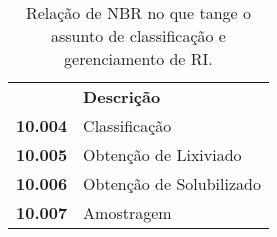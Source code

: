 \begin{table}[htbp]
  \centering
  \caption{Relação de NBR no que tange o assunto de classificação e gerenciamento de RI.}
    \begin{tabular}{c|p{13.07em}}
    \rowcolor[rgb]{ .969,  .588,  .275} \multicolumn{1}{p{4.785em}|}{\textcolor[rgb]{ 1,  1,  1}{\textbf{NBR}}} & \textcolor[rgb]{ 1,  1,  1}{\textbf{Descrição}} \\
    \rowcolor[rgb]{ .992,  .914,  .851} \textbf{10.004} & Classificação \\
    \rowcolor[rgb]{ .984,  .831,  .706} \textbf{10.005} & Obtenção de Lixiviado \\
    \rowcolor[rgb]{ .992,  .914,  .851} \textbf{10.006} & Obtenção de Solubilizado \\
    \rowcolor[rgb]{ .984,  .831,  .706} \textbf{10.007} & Amostragem \\
    \end{tabular}%
  \label{tab:nbr_ri}%
\end{table}%
